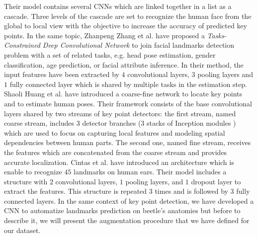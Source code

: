 \documentclass[review]{elsarticle}
\begin{document}
Their model contains several CNNs which are linked together in a list
as a cascade. Three levels of the cascade are set to recognize the
human face from the global to local view with the objective to
increase the accuracy of predicted key points. In the same topic,
Zhanpeng Zhang et al. \cite{zhang2014facial} have proposed a
\textit{Tasks-Constrained Deep Convolutional Network} to join facial
landmarks detection problem with a set of related tasks, e.g. head
pose estimation, gender classification, age prediction, or facial
attribute inference. In their method, the input features have been
extracted by $4$ convolutional layers, $3$ pooling layers and $1$
fully connected layer which is shared by  multiple tasks in the
estimation step. Shaoli Huang et al. \cite{huang2017coarse} have
introduced a coarse-fine network to locate key points and to estimate
human poses. Their framework consists of the base convolutional layers
shared by two streams of key point detectors: the first stream, named
coarse stream, includes $3$ detector branches (3 stacks of Inception
modules \cite{szegedy2015going}) which are used to focus on capturing
local features and modeling spatial dependencies between human
parts. The second one, named fine stream, receives the  features which
are concatenated from the coarse stream and provides accurate
localization. Cintas et al. \cite{cintas2016automatic} have introduced
an architecture which is enable to recognize $45$ landmarks on human
ears. Their model includes a structure with $2$ convolutional layers,
$1$ pooling layers, and $1$ dropout layer to extract the
features. This structure is repeated $3$ times and is followed by 3
fully connected layers. In the same context of key point detection, we
have developed a CNN to automatize landmarks prediction on beetle's
anatomies but before to describe it, we will present the augmentation
procedure that we have defined for our dataset.



\end{document}

